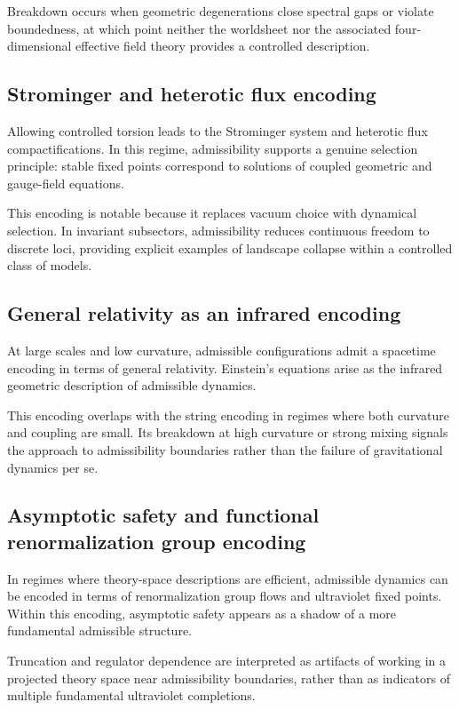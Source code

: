 \documentclass[11pt]{article}
\begin{document}
Breakdown occurs when geometric degenerations close spectral gaps or violate boundedness, at which point neither the worldsheet nor the associated four-dimensional effective field theory provides a controlled description.

\subsection{Strominger and heterotic flux encoding}

Allowing controlled torsion leads to the Strominger system and heterotic flux compactifications. In this regime, admissibility supports a genuine selection principle: stable fixed points correspond to solutions of coupled geometric and gauge-field equations.

This encoding is notable because it replaces vacuum choice with dynamical selection. In invariant subsectors, admissibility reduces continuous freedom to discrete loci, providing explicit examples of landscape collapse within a controlled class of models.

\subsection{General relativity as an infrared encoding}

At large scales and low curvature, admissible configurations admit a spacetime encoding in terms of general relativity. Einstein’s equations arise as the infrared geometric description of admissible dynamics.

This encoding overlaps with the string encoding in regimes where both curvature and coupling are small. Its breakdown at high curvature or strong mixing signals the approach to admissibility boundaries rather than the failure of gravitational dynamics per se.

\subsection{Asymptotic safety and functional renormalization group encoding}

In regimes where theory-space descriptions are efficient, admissible dynamics can be encoded in terms of renormalization group flows and ultraviolet fixed points. Within this encoding, asymptotic safety appears as a shadow of a more fundamental admissible structure.

Truncation and regulator dependence are interpreted as artifacts of working in a projected theory space near admissibility boundaries, rather than as indicators of multiple fundamental ultraviolet completions.
\end{document}
